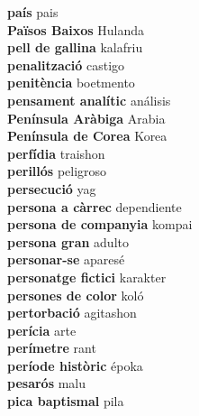 \textbf{ país  } pais \\
\textbf{ Països Baixos  } Hulanda \\
\textbf{ pell de gallina  } kalafriu \\
\textbf{ penalització  } castigo \\
\textbf{ penitència  } boetmento \\
\textbf{ pensament analític  } análisis \\
\textbf{ Península Aràbiga  } Arabia \\
\textbf{ Península de Corea  } Korea \\
\textbf{ perfídia  } traishon \\
\textbf{ perillós  } peligroso \\
\textbf{ persecució  } yag \\
\textbf{ persona a càrrec  } dependiente \\
\textbf{ persona de companyia  } kompai \\
\textbf{ persona gran  } adulto \\
\textbf{ personar-se  } aparesé \\
\textbf{ personatge fictici  } karakter \\
\textbf{ persones de color  } koló \\
\textbf{ pertorbació  } agitashon \\
\textbf{ perícia  } arte \\
\textbf{ perímetre  } rant \\
\textbf{ període històric  } époka \\
\textbf{ pesarós  } malu \\
\textbf{ pica baptismal  } pila \\
